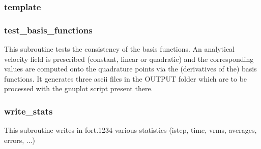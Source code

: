  \subsubsection{template}

 \subsubsection{test\_basis\_functions}
 This subroutine tests the consistency of the basis functions. 
 An analytical velocity field is prescribed (constant, linear or quadratic) and the 
 corresponding values are computed onto the quadrature points via the 
 (derivatives of the) basis functions.
 It generates three ascii files in the {\foldernamefont OUTPUT} folder which 
 are to be processed with the gnuplot script present there.
 \subsubsection{write\_stats}
 This subroutine writes in fort.1234 various statistics (istep, time, vrms, averages, 
 errors, ...) 
